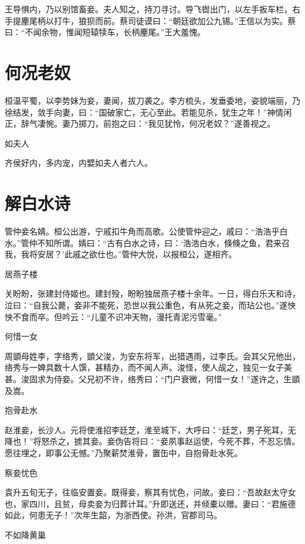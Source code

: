 \documentclass[a4paper,12pt,UTF8,twoside]{ctexbook}
\begin{document}
    王导惧内，乃以别馆畜妾。夫人知之，持刀寻讨。导飞辔出门，以左手扳车栏，右手提麈尾柄以打牛，狼狈而前。蔡司徒谟曰：“朝廷欲加公九锡。”王信以为实。蔡曰：“不闻余物，惟闻短辕犊车，长柄麈尾。”王大羞愧。
    
    \section{何况老奴}
    
    桓温平蜀，以李势妹为妾，妻闻，拔刀袭之。李方梳头，发垂委地，姿貌端丽，乃徐结发，敛手向妻，曰：“国破家亡，无心至此。若能见杀，犹生之年！”神情闲正，辞气凄惋。妻乃掷刀，前抱之曰：“我见犹怜，何况老奴？”遂善视之。
    
    如夫人
    
    齐侯好内，多内宠，内嬖如夫人者六人。
    
    \section{解白水诗}
    
    管仲妾名婧。桓公出游，宁戚扣牛角而高歌。公使管仲迎之，戚曰：“浩浩乎白水。”管仲不知所谓。婧曰：“古有白水之诗，曰：‘浩浩白水，倏倏之鱼，君来召我，我将安居？’此戚之欲仕也。”管仲大悦，以报桓公，遂相齐。
    
    居燕子楼
    
    关盼盼，张建封侍姬也。建封殁，盼盼独居燕子楼十余年。一日，得白乐天和诗，泣曰：“自我公薨，妾非不能死，恐世以我公重色，有从死之妾，而玷公也。”遂怏怏不食而卒。但吟云：“儿童不识冲天物，漫托青泥污雪毫。”
    
    何惜一女
    
    周顗母姓李，字络秀，顗父浚，为安东将军，出猎遇雨，过李氏。会其父兄他出，络秀与一婢具数十人馔，甚精办，而不闻人声。浚怪，使人觇之，独见一女子美甚。浚固求为侍妾。父兄初不许，络秀曰：“门户衰微，何惜一女！”遂许之，生顗及嵩。
    
    抱骨赴水
    
    赵淮妾，长沙人。元将使淮招李廷芝，淮至城下，大呼曰：“廷芝，男子死耳，无降也！”将怒杀之，掳其妾。妾伪告将曰：“妾夙事赵运使，今死不葬，不忍忘情。愿往埋之，即事公无憾。”乃聚薪焚淮骨，置缶中，自抱骨赴水死。
    
    察妾忧色
    
    袁升五旬无子，往临安置妾。既得妾，察其有忧色，问故。妾曰：“吾故赵太守女也，家四川，且贫，母卖妾为归葬计耳。”升即送还，并倾橐以赠。妻曰：“君施德如此，何患无子！”次年生韶，为浙西使。孙洪，官郡司马。
    
    不如降黄巢
    
\end{document}
